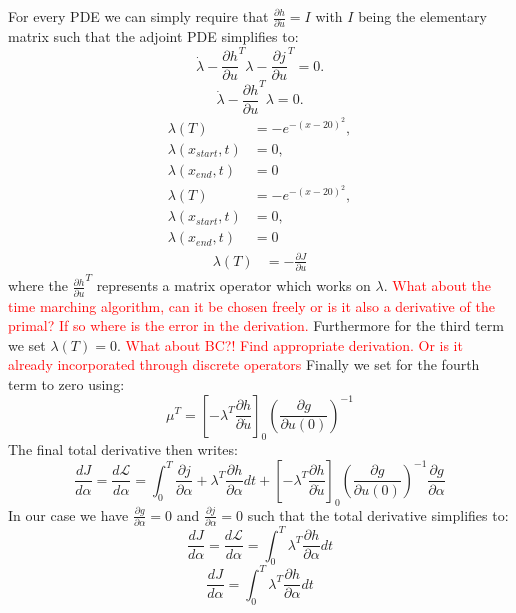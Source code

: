 \documentclass[10pt]{article}
\begin{document}
For every PDE we can simply require that $\frac{\partial h}{\partial\dot u} = I$ with $I$ being the elementary matrix such that the adjoint PDE simplifies to:
\begin{equation}
\dot\lambda - \frac{\partial h}{\partial u}^T \lambda  - \frac{\partial j}{\partial u}^T  = 0.
\end{equation}
\begin{equation}
\dot\lambda - \frac{\partial h}{\partial u}^T \lambda = 0.
\end{equation}
\begin{align}
\lambda(T) &= -e^{-(x-20)^2},\\
\lambda(x_{start},t) &= 0,\\ 
\lambda(x_{end},t) &= 0 
\end{align}
\begin{align}
\lambda(T) &= -e^{-(x-20)^2},\\
\lambda(x_{start},t) &= 0,\\ 
\lambda(x_{end},t) &= 0 
\end{align}
\begin{align}
\lambda(T) &= -\frac{\partial J}{\partial u}
\end{align}
where the $\frac{\partial h}{\partial u}^T$ represents a matrix operator which works on $\lambda$. \textcolor{red}{What about the time marching algorithm, can it be chosen freely or is it also a derivative of the primal? If so where is the error in the derivation.}
Furthermore for the third term we set $\lambda(T)=0$. \textcolor{red}{What about BC?! Find appropriate derivation. Or is it already incorporated through discrete operators} Finally we set for the fourth term to zero using:
\begin{equation}
\mu^T = \left[- \lambda^T \frac{\partial h}{\partial\dot u} \right]_0 \left( \frac{\partial g}{\partial u(0)}\right)^{-1}
\end{equation}
The final total derivative then writes:
\begin{equation}
\frac{dJ}{d \alpha} =  \frac{d\mathcal{L}}{d \alpha} = \int_{0}^{T}\frac{\partial j}{\partial \alpha} + \lambda^T \frac{\partial h}{\partial \alpha} dt + \left[- \lambda^T \frac{\partial h}{\partial\dot u} \right]_0 \left( \frac{\partial g}{\partial u(0)}\right)^{-1} \frac{\partial g}{\partial\alpha}
\end{equation}
In our case we have $\frac{\partial g}{\partial\alpha}=0$ and $\frac{\partial j}{\partial \alpha}=0$ such that the total derivative simplifies to:
\begin{equation}
\frac{dJ}{d \alpha} =  \frac{d\mathcal{L}}{d \alpha} = \int_{0}^{T} \lambda^T \frac{\partial h}{\partial \alpha} dt
\end{equation}
\begin{equation}
\frac{dJ}{d \alpha} = \int_{0}^{T} \lambda^T \frac{\partial h}{\partial \alpha} dt
\end{equation}
\newpage
\end{document}
